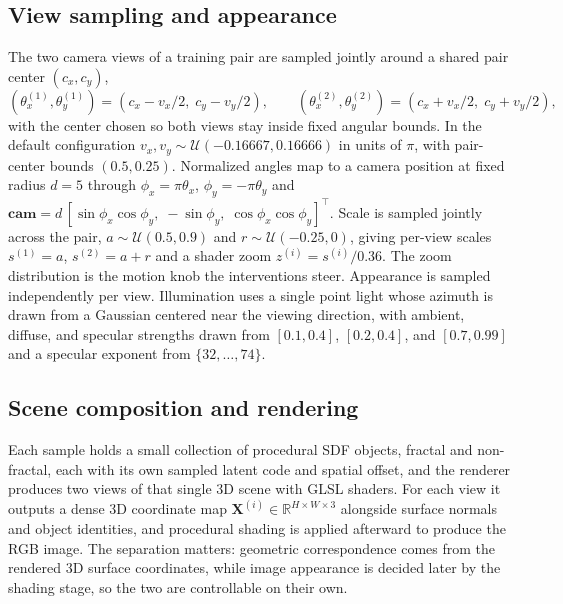 \documentclass[runningheads]{llncs}
\begin{document}
\subsection{View sampling and appearance}
The two camera views of a training pair are sampled jointly around a shared pair
center $(c_x,c_y)$,
\begin{equation}
(\theta_x^{(1)},\theta_y^{(1)}) = (c_x - v_x/2,\; c_y - v_y/2), \qquad
(\theta_x^{(2)},\theta_y^{(2)}) = (c_x + v_x/2,\; c_y + v_y/2),
\end{equation}
with the center chosen so both views stay inside fixed angular bounds. In the default
configuration $v_x, v_y \sim \mathcal{U}(-0.16667, 0.16666)$ in units of $\pi$, with
pair-center bounds $(0.5, 0.25)$. Normalized angles map to a camera position at fixed
radius $d=5$ through $\phi_x = \pi\theta_x$, $\phi_y = -\pi\theta_y$ and
$\mathbf{cam} = d\,[\sin\phi_x\cos\phi_y,\; -\sin\phi_y,\; \cos\phi_x\cos\phi_y]^\top$.
Scale is sampled jointly across the pair, $a\sim\mathcal{U}(0.5,0.9)$ and
$r\sim\mathcal{U}(-0.25,0)$, giving per-view scales $s^{(1)}=a$, $s^{(2)}=a+r$ and a
shader zoom $z^{(i)} = s^{(i)}/0.36$. The zoom distribution is the motion knob the
interventions steer. Appearance is sampled independently per view. Illumination uses
a single point light whose azimuth is drawn from a Gaussian centered near the viewing
direction, with ambient, diffuse, and specular strengths drawn from $[0.1,0.4]$,
$[0.2,0.4]$, and $[0.7,0.99]$ and a specular exponent from $\{32,\dots,74\}$.

\subsection{Scene composition and rendering}
Each sample holds a small collection of procedural SDF objects, fractal and
non-fractal, each with its own sampled latent code and spatial offset, and the
renderer produces two views of that single 3D scene with GLSL shaders. For each view
it outputs a dense 3D coordinate map $\mathbf{X}^{(i)}\in\mathbb{R}^{H\times W\times 3}$
alongside surface normals and object identities, and procedural shading is applied
afterward to produce the RGB image. The separation matters: geometric correspondence
comes from the rendered 3D surface coordinates, while image appearance is decided
later by the shading stage, so the two are controllable on their own.
\end{document}
